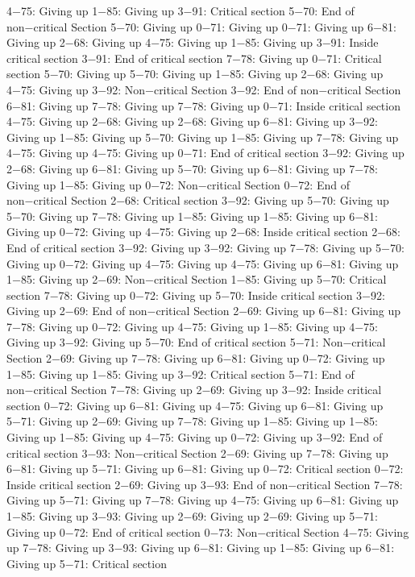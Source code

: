 4−75: Giving up
1−85: Giving up
3−91: Critical section
5−70: End of non−critical Section
5−70: Giving up
0−71: Giving up
0−71: Giving up
6−81: Giving up
2−68: Giving up
4−75: Giving up
1−85: Giving up
3−91: Inside critical section
3−91: End of critical section
7−78: Giving up
0−71: Critical section
5−70: Giving up
5−70: Giving up
1−85: Giving up
2−68: Giving up
4−75: Giving up
3−92: Non−critical Section
3−92: End of non−critical Section
6−81: Giving up
7−78: Giving up
7−78: Giving up
0−71: Inside critical section
4−75: Giving up
2−68: Giving up
2−68: Giving up
6−81: Giving up
3−92: Giving up
1−85: Giving up
5−70: Giving up
1−85: Giving up
7−78: Giving up
4−75: Giving up
4−75: Giving up
0−71: End of critical section
3−92: Giving up
2−68: Giving up
6−81: Giving up
5−70: Giving up
6−81: Giving up
7−78: Giving up
1−85: Giving up
0−72: Non−critical Section
0−72: End of non−critical Section
2−68: Critical section
3−92: Giving up
5−70: Giving up
5−70: Giving up
7−78: Giving up
1−85: Giving up
1−85: Giving up
6−81: Giving up
0−72: Giving up
4−75: Giving up
2−68: Inside critical section
2−68: End of critical section
3−92: Giving up
3−92: Giving up
7−78: Giving up
5−70: Giving up
0−72: Giving up
4−75: Giving up
4−75: Giving up
6−81: Giving up
1−85: Giving up
2−69: Non−critical Section
1−85: Giving up
5−70: Critical section
7−78: Giving up
0−72: Giving up
5−70: Inside critical section
3−92: Giving up
2−69: End of non−critical Section
2−69: Giving up
6−81: Giving up
7−78: Giving up
0−72: Giving up
4−75: Giving up
1−85: Giving up
4−75: Giving up
3−92: Giving up
5−70: End of critical section
5−71: Non−critical Section
2−69: Giving up
7−78: Giving up
6−81: Giving up
0−72: Giving up
1−85: Giving up
1−85: Giving up
3−92: Critical section
5−71: End of non−critical Section
7−78: Giving up
2−69: Giving up
3−92: Inside critical section
0−72: Giving up
6−81: Giving up
4−75: Giving up
6−81: Giving up
5−71: Giving up
2−69: Giving up
7−78: Giving up
1−85: Giving up
1−85: Giving up
1−85: Giving up
4−75: Giving up
0−72: Giving up
3−92: End of critical section
3−93: Non−critical Section
2−69: Giving up
7−78: Giving up
6−81: Giving up
5−71: Giving up
6−81: Giving up
0−72: Critical section
0−72: Inside critical section
2−69: Giving up
3−93: End of non−critical Section
7−78: Giving up
5−71: Giving up
7−78: Giving up
4−75: Giving up
6−81: Giving up
1−85: Giving up
3−93: Giving up
2−69: Giving up
2−69: Giving up
5−71: Giving up
0−72: End of critical section
0−73: Non−critical Section
4−75: Giving up
7−78: Giving up
3−93: Giving up
6−81: Giving up
1−85: Giving up
6−81: Giving up
5−71: Critical section
